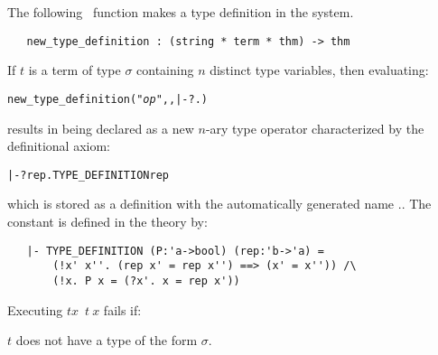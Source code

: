 The following \ML\ function makes a type definition in the \HOL{} system.

\begin{boxed}
\begin{verbatim}
   new_type_definition : (string * term * thm) -> thm
\end{verbatim}\end{boxed}

\noindent If $t$ is a term of type
$\sigma$ containing $n$ distinct type variables, then
evaluating:

{\def\op{{\normalsize\sl op}}
\begin{hol}\begin{alltt}
   new_type_definition("{\op}", , |- ?.)
\end{alltt}\end{hol}}

\noindent results in  being declared as a new $n$-ary type operator
characterized by the definitional
 axiom:

\begin{hol}\begin{alltt}
   |- ?rep. TYPE\_DEFINITION  rep
\end{alltt}\end{hol}

\noindent which is stored as a definition with the automatically
generated name
.. The constant
is defined in the theory  by:

\begin{hol}
\begin{verbatim}
   |- TYPE_DEFINITION (P:'a->bool) (rep:'b->'a) =
       (!x' x''. (rep x' = rep x'') ==> (x' = x'')) /\
       (!x. P x = (?x'. x = rep x'))
\end{verbatim}
\end{hol}

\noindent Executing $t$$x$\ $t\ x$\ml{)} fails if:
\begin{myenumerate}
\item $t$ does not have a type of the form $\sigma$.
\end{myenumerate}

